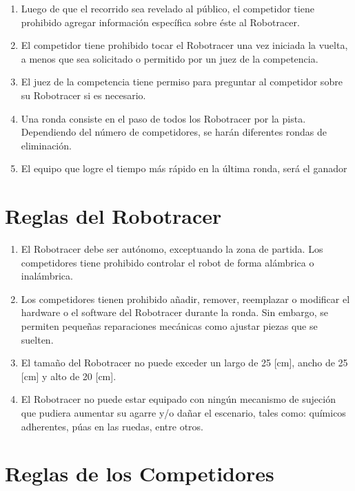 \begin{enumerate}
  \item Luego de que el recorrido sea revelado al público, el competidor tiene prohibido agregar información específica sobre éste al Robotracer.

  \item El competidor tiene prohibido tocar el Robotracer una vez iniciada la vuelta, a menos que sea solicitado o permitido por un juez de la competencia.

  \item El juez de la competencia tiene permiso para preguntar al competidor sobre su Robotracer si es necesario.

  \item Una ronda consiste en el paso de todos los Robotracer por la pista. Dependiendo del número de competidores, se harán diferentes rondas de eliminación.

  \item El equipo que logre el tiempo más rápido en la última ronda, será el ganador
\end{enumerate}


\section{Reglas del Robotracer}

\begin{enumerate}
  \item El Robotracer debe ser autónomo, exceptuando la zona de partida. Los competidores tiene prohibido controlar el robot de forma alámbrica o inalámbrica.

  \item Los competidores tienen prohibido añadir, remover, reemplazar o modificar el hardware o el software del Robotracer durante la ronda. Sin embargo, se permiten pequeñas reparaciones mecánicas como ajustar piezas que se suelten.

  \item El tamaño del Robotracer no puede exceder un largo de 25 [cm], ancho de 25 [cm] y alto de 20 [cm].

  \item El Robotracer no puede estar equipado con ningún mecanismo de sujeción que pudiera aumentar su agarre y/o dañar el escenario, tales como: químicos adherentes, púas en las ruedas, entre otros.
\end{enumerate}

\section{Reglas de los Competidores}

